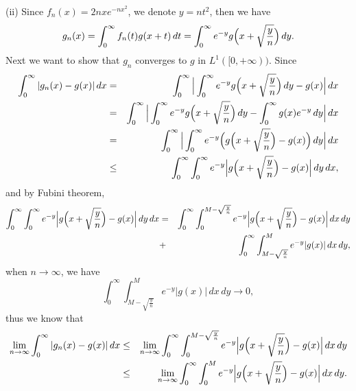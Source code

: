 \documentclass[12pt]{article}
\begin{document}
\vspace{4pt}

(ii) Since $f_{n} (x) = 2 n x e^{-n x^{2}}$, we denote $y = n t^{2}$, then we have
\begin{equation*}
    g_{n} (x) = \int_{0}^{\infty} f_{n} (t) g(x + t) \, d t = \int_{0}^{\infty} e^{-y} g \Big{(} x + \sqrt{\frac{y}{n}} \Big{)} \, d y.
\end{equation*}
Next we want to show that $g_{n}$ converges to $g$ in $L^{1}([0, + \infty))$. Since
\begin{eqnarray*}
\int_{0}^{\infty} |g_{n}(x) - g(x)| \, d x & = &  \int_{0}^{\infty} \Big{|} \int_{0}^{\infty}  e^{-y} g \Big{(} x + \sqrt{\frac{y}{n}} \Big{)} \, d y  - g(x) \Big{|} \, d x \\
& = &  \int_{0}^{\infty} \Big{|} \int_{0}^{\infty}  e^{-y} g \Big{(} x + \sqrt{\frac{y}{n}} \Big{)} \, d y  - \int_{0}^{\infty} g(x) e^{-y} \, d y  \Big{|} \, d x  \\
& = &  \int_{0}^{\infty} \Big{|} \int_{0}^{\infty}  e^{-y} \Big{(} g \Big{(} x + \sqrt{\frac{y}{n}} \Big{)}  - g(x) \Big{)} \, d y \Big{|} \, d x \\
& \leq & \int_{0}^{\infty} \int_{0}^{\infty}  e^{-y} \Big{|} g \Big{(} x + \sqrt{\frac{y}{n}} \Big{)}  - g(x) \Big{|} \, d y \, d x,
\end{eqnarray*}
and by Fubini theorem,
\begin{eqnarray*}
\int_{0}^{\infty} \int_{0}^{\infty}  e^{-y} \Big{|} g \Big{(} x + \sqrt{\frac{y}{n}} \Big{)}  - g(x) \Big{|} \, d y \, d x & = &  \int_{0}^{\infty} \int_{0}^{M - \sqrt{\frac{y}{n}}}  e^{-y} \Big{|} g \Big{(} x + \sqrt{\frac{y}{n}} \Big{)}  - g(x) \Big{|} \, d x \, d y \\
& + & \int_{0}^{\infty} \int_{M - \sqrt{\frac{y}{n}}}^{M}  e^{-y} | g(x) | \, d x \, d y ,
\end{eqnarray*}
when $n \to \infty$, we have
\begin{equation*}
    \int_{0}^{\infty} \int_{M - \sqrt{\frac{y}{n}}}^{M}  e^{-y} | g(x) | \, d x \, d y \to 0,
\end{equation*}
thus we know that
\begin{eqnarray*}
 \lim_{n \to \infty} \int_{0}^{\infty} |g_{n}(x) - g(x)| \, d x  & \leq & \lim_{n \to \infty}  \int_{0}^{\infty} \int_{0}^{M - \sqrt{\frac{y}{n}}}  e^{-y} \Big{|} g \Big{(} x + \sqrt{\frac{y}{n}} \Big{)}  - g(x) \Big{|} \, d x \, d y \\
 & \leq & \lim_{n \to \infty}  \int_{0}^{\infty} \int_{0}^{M}  e^{-y} \Big{|} g \Big{(} x + \sqrt{\frac{y}{n}} \Big{)}  - g(x) \Big{|} \, d x \, d y.
\end{eqnarray*}
\end{document}
